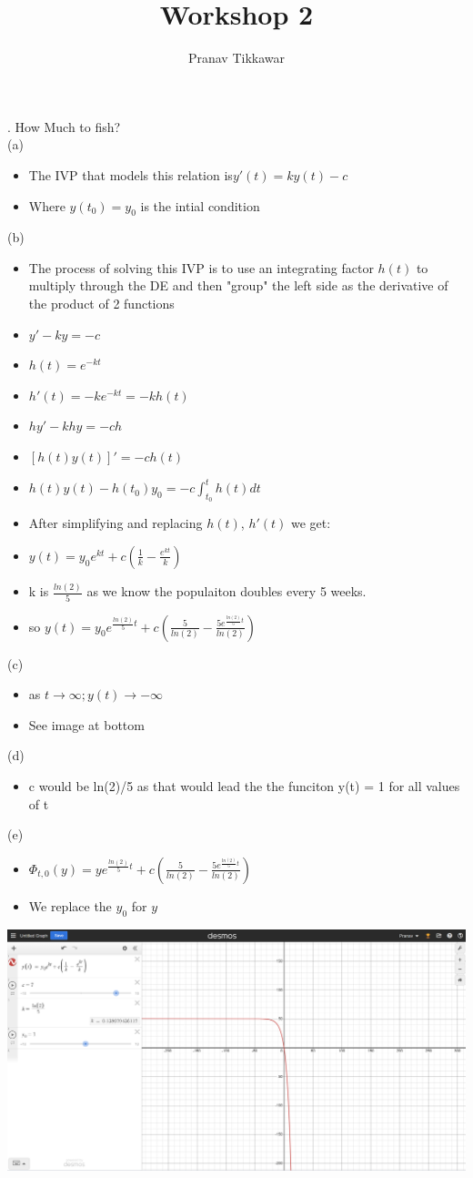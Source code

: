 \documentclass{article}
\author{Pranav Tikkawar}
\title{Workshop 2}
\begin{document}
. How Much to fish? \\
(a)  \begin{itemize}
    \item The IVP that models this relation is$y'(t) = k y(t) - c $ 
    \item Where $y(t_0) = y_0 $ is the intial condition
\end{itemize}
(b) \begin{itemize}
    \item The process of solving this IVP is to use an integrating factor $h(t)$ to multiply through the DE and then "group" the left side as the derivative of the product of 2 functions
    \item $y' - ky = -c $ 
    \item $h(t) = e^{-kt} $
    \item $h'(t) = -ke^{-kt} = -k h(t) $
    \item $hy' - khy = -ch $
    \item $[h(t)y(t)]' = -ch(t) $
    \item $h(t)y(t) - h(t_0)y_0 = -c\int_{t_0}^{t}h(t)dt$
    \item After simplifying and replacing $h(t)$, $h'(t)$ we get:
    \item $y(t) = y_0 e^{kt} + c(\frac{1}{k} - \frac{e^{kt}}{k})$
    \item k is $\frac{ln(2)}{5}$ as we know the populaiton doubles every 5 weeks. 
    \item so $y(t) = y_0 e^{\frac{ln(2)}{5}t} + c(\frac{5}{ln(2)} - \frac{5e^{\frac{ln(2)}{5}t}}{ln(2)}) $
\end{itemize}
(c)\begin{itemize}
    \item as $t \rightarrow \infty ; y(t) \rightarrow -\infty$
    \item See image at bottom
\end{itemize}
(d) \begin{itemize}
    \item c would be ln(2)/5 as that would lead the the funciton y(t) = 1 for all values of t
\end{itemize} 
(e) \begin{itemize}
    \item $ \Phi_{t,0}(y)= ye^{\frac{ln(2)}{5}t} + c(\frac{5}{ln(2)} - \frac{5e^{\frac{ln(2)}{5}t}}{ln(2)}) $
    \item We replace the $y_0$ for $y $
\end{itemize}
\begin{center}
    \includegraphics[scale=.2]{FishPlot.png}
\end{center}
\end{document}

